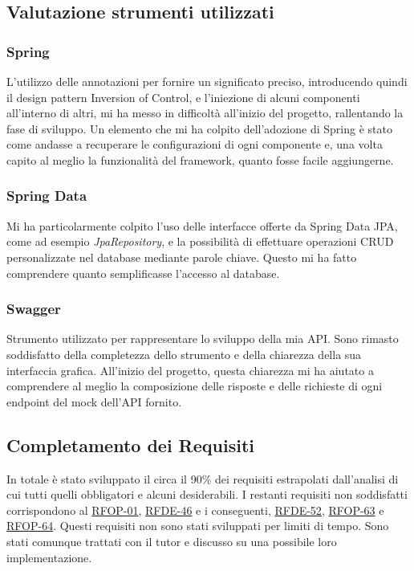 \subsection{Valutazione strumenti utilizzati}
\subsubsection*{Spring}
L'utilizzo delle annotazioni per fornire un significato preciso, introducendo quindi il design pattern Inversion of Control, e l'iniezione di alcuni componenti all'interno di altri, mi ha messo in difficoltà all'inizio del progetto, rallentando la fase di sviluppo.
Un elemento che mi ha colpito dell'adozione di Spring è stato come andasse a recuperare le configurazioni di ogni componente e, una volta capito al meglio la funzionalità del framework, quanto fosse facile aggiungerne.

\subsubsection*{Spring Data}
Mi ha particolarmente colpito l'uso delle interfacce offerte da Spring Data JPA, come ad esempio \textit{JpaRepository}, e la possibilità di effettuare operazioni CRUD personalizzate nel database mediante parole chiave. Questo mi ha fatto comprendere quanto semplificasse l'accesso al database.

\subsubsection*{Swagger}
Strumento utilizzato per rappresentare lo sviluppo della mia API. Sono rimasto soddisfatto della completezza dello strumento e della chiarezza della sua interfaccia grafica. All'inizio del progetto, questa chiarezza mi ha aiutato a comprendere al meglio la composizione delle risposte e delle richieste di ogni endpoint del mock dell'API fornito.

\subsection{Completamento dei Requisiti}
In totale è stato sviluppato il circa il 90\% dei requisiti estrapolati dall'analisi di cui tutti quelli obbligatori e alcuni desiderabili. I restanti requisiti non soddisfatti corrispondono al \hyperlink{rf01}{RFOP-01}, \hyperlink{rf46}{RFDE-46} e i conseguenti, \hyperlink{rf52}{RFDE-52}, \hyperlink{rf63}{RFOP-63} e \hyperlink{rf64}{RFOP-64}. Questi requisiti non sono stati sviluppati per limiti di tempo. Sono stati comunque trattati con il tutor e discusso su una possibile loro implementazione.

